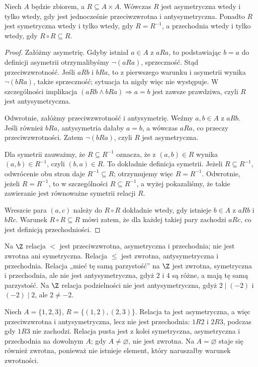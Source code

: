 \begin{twierdzenie}
\label{thm:asymmetric}
Niech $A$ będzie zbiorem, a $R\subseteq A\times A$.
Wówczas $R$ jest asymetryczna wtedy i tylko wtedy, gdy
jest jednocześnie przeciwzwrotna i antysymetryczna.
Ponadto $R$ jest symetryczna wtedy i tylko wtedy,
gdy $R=R^{-1}$, a przechodnia wtedy i tylko wtedy,
gdy $R\circ R\subseteq R$.
\end{twierdzenie}
\begin{proof}
Załóżmy asymetrię. Gdyby istniał $a\in A$ z $aRa$,
to podstawiając $b=a$ do definicji asymetrii otrzymalibyśmy
$\neg(aRa)$, sprzeczność. Stąd przeciwzwrotność.
Jeśli $aRb$ i $bRa$, to z pierwszego warunku i asymetrii
wynika $\neg(bRa)$, także sprzeczność; sytuacja ta
nigdy więc nie występuje. W szczególności implikacja
$(aRb\land bRa)\Rightarrow a=b$ jest zawsze prawdziwa,
czyli $R$ jest antysymetryczna.

Odwrotnie, załóżmy przeciwzwrotność i antysymetrię.
Weźmy $a,b\in A$ z $aRb$. Jeśli również $bRa$,
antysymetria dałaby $a=b$, a wówczas $aRa$,
co przeczy przeciwzwrotności. Zatem $\neg(bRa)$,
czyli $R$ jest asymetryczna.

Dla symetrii zauważmy, że $R\subseteq R^{-1}$ oznacza,
że z $(a,b)\in R$ wynika $(a,b)\in R^{-1}$,
czyli $(b,a)\in R$. To dokładnie definicja symetrii.
Jeżeli $R\subseteq R^{-1}$, odwrócenie obu stron
daje $R^{-1}\subseteq R$; otrzymujemy więc $R=R^{-1}$.
Odwrotnie, jeżeli $R=R^{-1}$, to w szczególności
$R\subseteq R^{-1}$, a wyżej pokazaliśmy, że takie zawieranie
jest równoważne symetrii relacji $R$.

Wreszcie para $(a,c)$ należy do $R\circ R$ dokładnie
wtedy, gdy istnieje $b\in A$ z $aRb$ i $bRc$.
Warunek $R\circ R\subseteq R$ mówi zatem, że dla
każdej takiej pary zachodzi $aRc$, co jest definicją
przechodniości.
\end{proof}

\begin{przyklad}
Na $\Z$ relacja $<$ jest przeciwzwrotna, asymetryczna
i przechodnia; nie jest zwrotna ani symetryczna.
Relacja $\le$ jest zwrotna, antysymetryczna i przechodnia.
Relacja „mieć tę samą parzystość” na $\Z$ jest zwrotna,
symetryczna i przechodnia, ale nie jest antysymetryczna,
gdyż $2$ i $4$ są różne, a mają tę samą parzystość.
Na $\Z$ relacja podzielności nie jest antysymetryczna,
gdyż $2\mid(-2)$ i $(-2)\mid2$, ale $2\ne-2$.
\end{przyklad}

\begin{przyklad}
Niech $A=\{1,2,3\}$, $R=\{(1,2),(2,3)\}$.
Relacja ta jest asymetryczna, a więc przeciwzwrotna
i antysymetryczna, lecz nie jest przechodnia:
$1R2$ i $2R3$, podczas gdy $1R3$ nie zachodzi.
Relacja pusta jest z kolei symetryczna, asymetryczna
i przechodnia na dowolnym $A$; gdy $A\ne\varnothing$,
nie jest zwrotna. Na $A=\varnothing$ staje się również
zwrotna, ponieważ nie istnieje element, który naruszałby
warunek zwrotności.
\end{przyklad}

